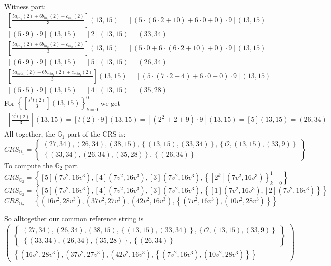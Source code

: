 \begin{example}
Witness part:
\begin{multline*}
\left[\frac{5 a_{in_1}(2)+6 b_{in_1}(2)+c_{in_1}(2)}{3}\right](13,15) = 
\left[(5\cdot (6\cdot 2 +10) +6\cdot 0 +0 )\cdot 9\right](13,15) = \\
\left[(5\cdot 9)\cdot 9\right](13,15) =
\left[2\right](13,15) = (33,34)
\end{multline*}
\begin{multline*}
\left[\frac{5 a_{in_2}(2)+6 b_{in_2}(2)+c_{in_2}(2)}{3}\right](13,15) = 
\left[(5\cdot 0 +6\cdot (6\cdot 2 + 10) + 0 )\cdot 9\right](13,15) = \\
\left[(6\cdot 9)\cdot 9\right](13,15) =
\left[5\right](13,15) =
(26,34)
\end{multline*}
\begin{multline*}
\left[\frac{5 a_{mid_1}(2)+6 b_{mid_1}(2)+c_{mid_1}(2)}{3}\right](13,15) = 
\left[(5\cdot (7\cdot 2 + 4) +6\cdot 0 + 0 )\cdot 9\right](13,15) = \\
\left[(5\cdot 5)\cdot 9\right](13,15) =
\left[4\right](13,15) =
(35,28)
\end{multline*}
For $\left\{\left[\frac{s^{k}t(2)}{3}\right](13,15)\right\} _{k=0}^{0}$ we get
\begin{multline*}
\left[\frac{2^{0}t(2)}{3}\right](13,15)=
[t(2)\cdot 9](13,15)= 
[(2^2+2+9)\cdot 9](13,15)= 
[5](13,15) =
(26,34)
\end{multline*}
All together, the $\mathbb{G}_1$ part of the CRS is:
$$
CRS_{\mathbb{G}_{1}}=\left\{ \begin{array}{c}
(27,34),(26,34),(38,15),\left\{(13,15),(33,34)\right\},
\left\{\mathcal{O}, (13,15), (33,9)\right\}\\
\left\{(33,34),(26,34),(35,28)\right\},
\left\{(26,34)\right\}
\end{array}\right\}
$$
To compute the $\mathbb{G}_2$ part 
$$
CRS_{\mathbb{G}_{2}}=\left\{ [5](7v^2,16v^3) ,[4](7v^2,16v^3),[3](7v^2,16v^3),\left\{[2^k](7v^2,16v^3)\right\} _{k=0}^{1}\right\} 
$$
$$
CRS_{\mathbb{G}_{2}}=\left\{ [5](7v^2,16v^3) ,[4](7v^2,16v^3),[3](7v^2,16v^3),\left\{[1](7v^2,16v^3), [2](7v^2,16v^3)\right\}\right\} 
$$
$$
CRS_{\mathbb{G}_{2}}=\left\{(16v^2,28v^3) ,(37v^2,27v^3),(42v^2,16v^3),\left\{(7v^2,16v^3), (10v^2,28v^3)\right\}\right\} 
$$

So alltogether our common reference string is 
$$
\begin{pmatrix}
\left\{ \begin{array}{c}
(27,34),(26,34),(38,15),\left\{(13,15),(33,34)\right\},
\left\{\mathcal{O}, (13,15), (33,9)\right\}\\
\left\{(33,34),(26,34),(35,28)\right\},
\left\{(26,34)\right\}
\end{array}\right\}\\
\left\{(16v^2,28v^3) ,(37v^2,27v^3),(42v^2,16v^3),\left\{(7v^2,16v^3), (10v^2,28v^3)\right\}\right\}
\end{pmatrix}
$$
\end{example}
